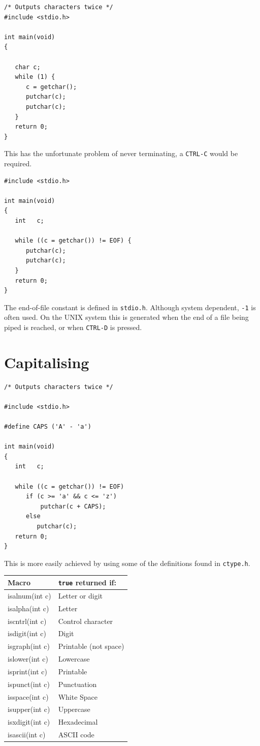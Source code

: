 \documentclass[a4,portraitt]{slides}
\begin{document}
\begin{verbatim}
/* Outputs characters twice */                                                     
#include <stdio.h>

int main(void)
{

   char c;
   while (1) {
      c = getchar();
      putchar(c);
      putchar(c);
   }
   return 0;
}
\end{verbatim}
\newpage

This has the unfortunate problem of never terminating,
a {\tt CTRL-C} would be required.

\begin{verbatim}
#include <stdio.h>

int main(void)
{
   int   c;

   while ((c = getchar()) != EOF) {
      putchar(c);
      putchar(c);
   }
   return 0;
}
\end{verbatim}

The end-of-file constant is defined in {\tt stdio.h}. Although
system dependent, {\tt -1} is often used. On the UNIX system
this is generated when the end of a file being piped is reached,
or when {\tt CTRL-D} is pressed.

\section*{Capitalising}

\begin{verbatim}
/* Outputs characters twice */

#include <stdio.h>

#define CAPS ('A' - 'a')

int main(void)
{
   int   c;

   while ((c = getchar()) != EOF)
      if (c >= 'a' && c <= 'z')
          putchar(c + CAPS);
      else
         putchar(c);
   return 0;
}
\end{verbatim}

\newpage
This is more easily achieved by using some of
the definitions found in {\tt ctype.h}.

\begin{center}
\begin{tabular}{|l|l|} \hline
Macro        & {\tt true} returned if: \\ \hline
isalnum(int c) & Letter or digit \\
isalpha(int c) & Letter \\
iscntrl(int c) & Control character \\
isdigit(int c) & Digit \\
isgraph(int c) & Printable (not space) \\
islower(int c) & Lowercase\\
isprint(int c) & Printable\\
ispunct(int c) & Punctuation\\
isspace(int c) & White Space\\
isupper(int c) & Uppercase\\
isxdigit(int c)& Hexadecimal\\
isascii(int c) & ASCII code \\ \hline
\end{tabular}
\end{center}
\end{document}
